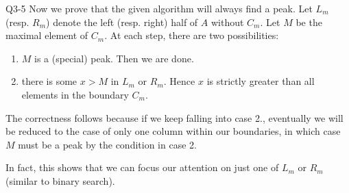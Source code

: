 \documentclass{scratcl}
\begin{document}
\begin{frame}{Q3-5}
  Now we prove that the given algorithm will always find a peak. Let $L_m$ (resp. $R_m$) denote the left (resp. right) half of $A$ without $C_m$. Let $M$ be the maximal element of $C_m$. 
  At each step, there are two possibilities:
  \begin{enumerate}
    \item $M$ is a (special) peak. Then we are done. 
    \item there is some $x > M$ in $L_m$ or $R_m$. Hence $x$ is strictly greater than all elements in the boundary $C_m$. 
  \end{enumerate}
  The correctness follows because if we keep falling into case 2., eventually we will be reduced to the case of only one column within our boundaries, in which case $M$ must be a peak by the condition in case 2.
  \par In fact, this shows that we can focus our attention on just one of $L_m$ or $R_m$ (similar to binary search). 
\end{frame}
\end{document}
